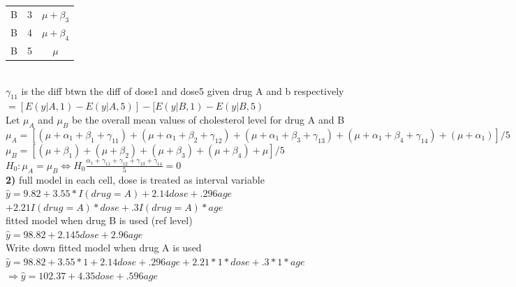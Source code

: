 \documentclass[10pt,landscape]{article}
\newcommand{\B}{\beta}
\newcommand{\lra}{\Leftrightarrow}
\newcommand{\ra}{\Rightarrow}
\newcommand{\al}{\alpha}
\newcommand{\ga}{\gamma}
\begin{document}
\begin{multicols*}{4}
{\begin{tabular}{|c c c|}
		B & 3 & $\mu+\B_3$\\
		B & 4 & $\mu+\B_4$\\
		B & 5 & $\mu$\\
		\hline
\end{tabular}}\\
$\gamma_{11}$ is the diff btwn the diff of dose1 and dose5 given drug A and b respectively\\
$=[E(y|A,1)-E(y|A,5)]-[E(y|B,1)-E(y|B,5)$\\
Let $\mu_A$ and $\mu_B$ be the overall mean values of cholesterol level for drug A and B\\
$\mu_A=[(\mu+\alpha_1+\B_1+\gamma_{11})+(\mu+\al_1+\B_2+\ga_{12})+(\mu+\al_1+\B_3+\ga_{13})+(\mu+\al_1+\B_4+\ga_{14})+(\mu+\al_1)]/5$\\
$\mu_B=[(\mu+\B_1)+(\mu+\B_2)+(\mu+\B_3)+(\mu+\B_4)+\mu]/5$\\
$H_0:\mu_A=\mu_B\lra H_0\frac{\al_1+\ga_{11}+\ga_{12}+\ga_{13}+\ga_{14}}{5}=0$\\
\textbf{2)} full model in each cell, dose is treated as interval variable\\
$\hat{y}=9.82+3.55*I(drug=A)+2.14 dose+.296age$ $+2.21I(drug=A)* dose+ . 3I (drug =A)*age$\\
fitted model when drug B is used (ref level)\\
$\hat{y}=98.82+2.145dose+2.96age$\\
Write down fitted model when drug A is used\\
$\hat{y}=98.82+3.55*1+2.14dose+.296age+2.21*1*dose+.3*1*age$\\
$\ra\hat{y}=102.37+4.35dose+.596age$\\


\end{multicols*} 
\end{document}
